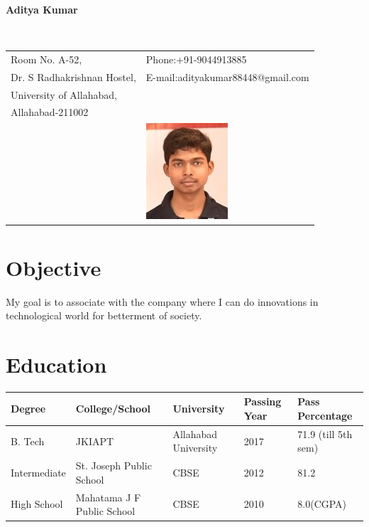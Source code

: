 \documentclass[11pt]{article}
\begin{document}
\vspace{0.5in}
	\begin{center}\begin{large}\textbf{Aditya Kumar}\end{large}\end{center}\textbf{\hrulefill}\\
	\begin{tabular}{@{}p{4in}p{3in}}
		Room No. A-52, & {Phone:}+91-9044913885 \\
		Dr. S Radhakrishnan Hostel, & {E-mail:}adityakumar88448@gmail.com\\
		University of Allahabad, \\
		Allahabad-211002\\
		& \includegraphics[scale=0.7]{Aditya.jpg}\\
	\end{tabular}
	
	\section*{Objective}
	My goal is to associate with the company where  I can do innovations in technological world for betterment of society.  
	\section*{Education}
	\begin{tabular}{|l|l|l|l|l|}
		\hline
		Degree & College/School & University & Passing Year & Pass Percentage\\
		\hline
		B. Tech & JKIAPT & Allahabad University & 2017 & 71.9 (till 5th sem)\\
		\hline
		Intermediate & St. Joseph Public School & CBSE & 2012 & 81.2\\
		\hline
		High School & Mahatama J F Public School & CBSE & 2010 & 8.0(CGPA)\\
		\hline
	\end{tabular}
	
\end{document}
